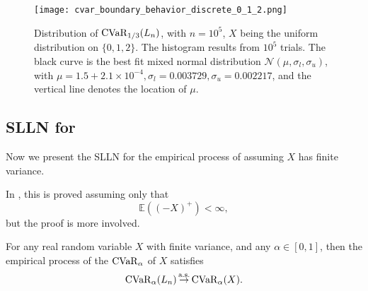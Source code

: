 \begin{figure}
	\centering
	\texttt{[image: cvar\_boundary\_behavior\_discrete\_0\_1\_2.png]}
	\caption{Distribution of $\operatorname{CVaR}_{1/3}(L_n)$, with $n=10^5$, $X$ being the uniform distribution on $\{0, 1, 2\}$. The histogram results from $10^5$ trials. The black curve is the best fit mixed normal distribution $\mathcal{N}(\mu, \sigma_l, \sigma_u)$, with $\mu = 1.5 + 2.1 \times 10^{-4}, \sigma_l = 0.003729, \sigma_u = 0.002217$, and the vertical line denotes the location of $\mu$. }
	\label{fig:cvar_boundary_behavior_discrete_0_1_2}
\end{figure}

\subsection{SLLN for \cvar}
\label{sec:slln_for_cvar}
Now we present the SLLN for the empirical process of \cvar assuming $X$ has finite variance. 

In \cite[Proposition 4.1]{acerbiCoherenceExpectedShortfall2002}, this is proved assuming only that $$\mathbb{E}((-X)^+)<\infty,$$
but the proof is more involved. 

\begin{theorem}\label{thm:slln_cvar}
For any real random variable $X$ with finite variance, and any $\alpha\in[0, 1]$, then the empirical process of the $\operatorname{CVaR}_\alpha$ of $X$ satisfies
\begin{equation}
\operatorname{CVaR}_\alpha(L_n) \operatorname*{\stackrel{\text {a.s.}}{\rightarrow}} \operatorname{CVaR}_\alpha(X).
\end{equation}
\end{theorem}

